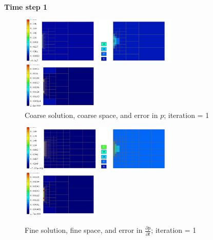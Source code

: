 \textbf{Time step 1}
\begin{figure}[H]
		\includegraphics[width=0.33\textwidth]{img/acoustics/Solution_1.png}\hspace{1mm}
		\includegraphics[width=0.33\textwidth]{img/acoustics/Space_1.png}\hspace{1mm}
		\includegraphics[width=0.33\textwidth]{img/acoustics/ErrorValue_1.png}\\
		\caption{Coarse solution, coarse space, and error in $p$; iteration = 1}
\vspace{5mm}
		\includegraphics[width=0.33\textwidth]{img/acoustics/RefSolution_1.png}\hspace{1mm}
		\includegraphics[width=0.33\textwidth]{img/acoustics/RefSpace_1.png}\hspace{1mm}
		\includegraphics[width=0.33\textwidth]{img/acoustics/ErrorDerivative_1.png}\\
		\caption{Fine solution, fine space, and error in $\frac{\partial p}{\partial t}$; iteration = 1}
	\end{figure}

